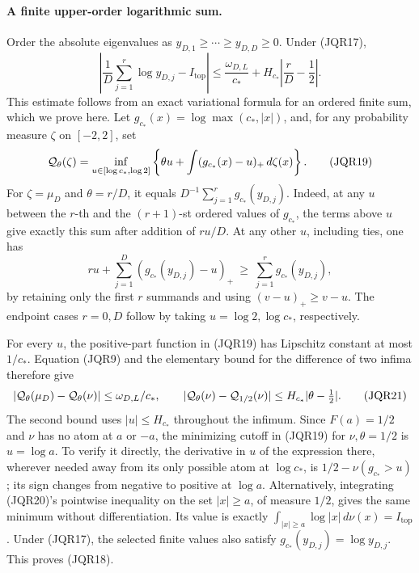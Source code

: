 \paragraph{A finite upper-order logarithmic sum.}
Order the absolute eigenvalues as
\(y_{D,1}\geq\cdots\geq y_{D,D}\geq0\).
Under (JQR17),
\[
 \left|\frac1D\sum_{j=1}^r\log y_{D,j}-I_{\mathrm{top}}\right|
 \leq \frac{\omega_{D,L}}{c_*}
       +H_{c_*}\left|\frac rD-\frac12\right|.
 \tag{JQR18}
\]
This estimate follows from an exact variational formula for an ordered
finite sum, which we prove here.  Let
\(g_{c_*}(x)=\log\max(c_*,|x|)\), and, for any probability measure \(\zeta\)
on \([-2,2]\), set
\[
 {\cal Q}_\theta(\zeta)
 =\inf_{u\in[\log c_*,\log2]}
       \left\{\theta u+\int(g_{c_*}(x)-u)_+\,d\zeta(x)\right\}.
 \tag{JQR19}
\]
For \(\zeta=\mu_D\) and \(\theta=r/D\), it equals
\(D^{-1}\sum_{j=1}^r g_{c_*}(y_{D,j})\).
Indeed, at any \(u\) between the \(r\)-th and the \((r+1)\)-st
ordered values of \(g_{c_*}\), the terms above \(u\) give exactly this
sum after addition of \(ru/D\).  At any other \(u\), including ties,
one has
\[
 ru+\sum_{j=1}^D(g_{c_*}(y_{D,j})-u)_+
 \ \geq\ \sum_{j=1}^r g_{c_*}(y_{D,j}),
 \tag{JQR20}
\]
by retaining only the first \(r\) summands and using
\((v-u)_+\geq v-u\).  The endpoint cases \(r=0,D\) follow by
taking \(u=\log2,\log c_*\), respectively.

For every \(u\), the positive-part function in (JQR19) has Lipschitz
constant at most \(1/c_*\).  Equation (JQR9) and the elementary bound
for the difference of two infima therefore give
\[
 |{\cal Q}_\theta(\mu_D)-{\cal Q}_\theta(\nu)|
       \leq\omega_{D,L}/c_*,\qquad
 |{\cal Q}_\theta(\nu)-{\cal Q}_{1/2}(\nu)|
       \leq H_{c_*}|\theta-\tfrac12|.
 \tag{JQR21}
\]
The second bound uses \(|u|\leq H_{c_*}\) throughout the infimum.
Since \(F(a)=1/2\) and \(\nu\) has no atom at \(a\) or \(-a\),
the minimizing cutoff in (JQR19) for \(\nu,\theta=1/2\) is
\(u=\log a\).  To verify it directly, the derivative in \(u\) of
the expression there, wherever needed away from its only possible
atom at \(\log c_*\), is
\(1/2-\nu(g_{c_*}>u)\); its sign changes from negative to positive
at \(\log a\).  Alternatively, integrating (JQR20)'s pointwise
inequality on the set \(|x|\geq a\), of measure \(1/2\), gives the
same minimum without differentiation.  Its value is exactly
\(\int_{|x|\geq a}\log|x|\,d\nu(x)=I_{\mathrm{top}}\).
Under (JQR17), the selected finite values also satisfy
\(g_{c_*}(y_{D,j})=\log y_{D,j}\).  This proves (JQR18).

